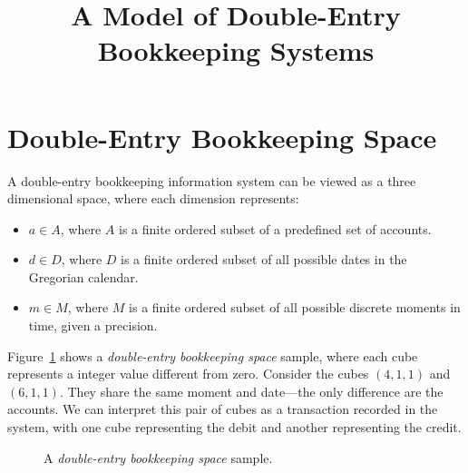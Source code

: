 \documentclass{article}
\begin{document}
\title{A Model of Double-Entry Bookkeeping Systems}
\author{}
\date{}
\maketitle

\section{Double-Entry Bookkeeping Space}

A double-entry bookkeeping information system can be viewed as a three dimensional space,
where each dimension represents:

\begin{itemize}
	\item $a \in A$, where $A$ is a finite ordered subset of a predefined set of accounts.
	\item $d \in D$, where $D$ is a finite ordered subset of all 
		possible dates in the Gregorian calendar.
	\item $m \in M$, where $M$ is a finite ordered subset of all 
		possible discrete moments in time, given a precision.
\end{itemize}

Figure~\ref{fig:deb-space-sample} shows a \emph{double-entry bookkeeping space} sample, 
where each cube represents a integer value different from zero.
Consider the cubes $(4,1,1)$ and $(6,1,1)$. They share the same moment 
and date---the only difference are the accounts. 
We can interpret this pair of cubes as a transaction recorded in the system,
with one cube representing the debit and another representing the credit.

\begin{figure}[h]
\centering
{}
\label{fig:deb-space-sample}
\caption{A \emph{double-entry bookkeeping space} sample.}
\end{figure}
\end{document}
